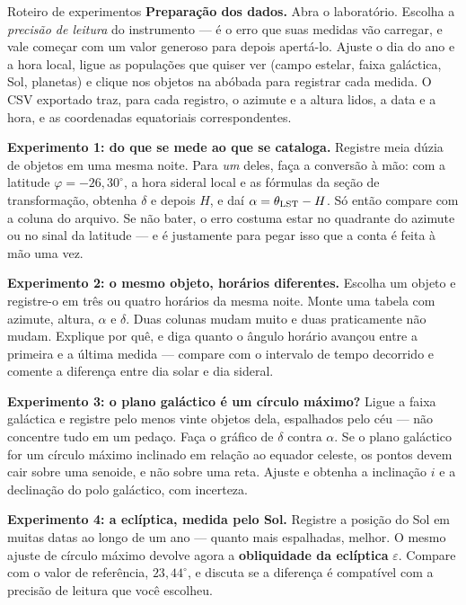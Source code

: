 \documentclass[11pt,a4paper]{article}
\begin{document}
\begin{lessonblock}[borderline west={2pt}{0pt}{astroGold}]{Roteiro de experimentos}
\textbf{Preparação dos dados.} Abra o laboratório. Escolha a \textit{precisão de leitura} do instrumento --- é
o erro que suas medidas vão carregar, e vale começar com um valor generoso para depois apertá-lo. Ajuste o dia
do ano e a hora local, ligue as populações que quiser ver (campo estelar, faixa galáctica, Sol, planetas) e
clique nos objetos na abóbada para registrar cada medida. O CSV exportado traz, para cada registro, o azimute
e a altura lidos, a data e a hora, e as coordenadas equatoriais correspondentes.

\textbf{Experimento 1: do que se mede ao que se cataloga.}
Registre meia dúzia de objetos em uma mesma noite. Para \emph{um} deles, faça a conversão à mão: com a latitude
$\varphi=-26{,}30^\circ$, a hora sideral local e as fórmulas da seção de transformação, obtenha $\delta$ e depois
$H$, e daí $\alpha=\theta_{\rm LST}-H$. Só então compare com a coluna do arquivo. Se não bater, o erro costuma
estar no quadrante do azimute ou no sinal da latitude --- e é justamente para pegar isso que a conta é feita à
mão uma vez.

\textbf{Experimento 2: o mesmo objeto, horários diferentes.}
Escolha um objeto e registre-o em três ou quatro horários da mesma noite. Monte uma tabela com azimute, altura,
$\alpha$ e $\delta$. Duas colunas mudam muito e duas praticamente não mudam. Explique por quê, e diga quanto o
ângulo horário avançou entre a primeira e a última medida --- compare com o intervalo de tempo decorrido e
comente a diferença entre dia solar e dia sideral.

\textbf{Experimento 3: o plano galáctico é um círculo máximo?}
Ligue a faixa galáctica e registre pelo menos vinte objetos dela, espalhados pelo céu --- não concentre tudo em
um pedaço. Faça o gráfico de $\delta$ contra $\alpha$. Se o plano galáctico for um círculo máximo inclinado em
relação ao equador celeste, os pontos devem cair sobre uma senoide, e não sobre uma reta. Ajuste e obtenha a
inclinação $i$ e a declinação do polo galáctico, com incerteza.

\textbf{Experimento 4: a eclíptica, medida pelo Sol.}
Registre a posição do Sol em muitas datas ao longo de um ano --- quanto mais espalhadas, melhor. O mesmo ajuste
de círculo máximo devolve agora a \textbf{obliquidade da eclíptica} $\varepsilon$. Compare com o valor de
referência, $23{,}44^\circ$, e discuta se a diferença é compatível com a precisão de leitura que você escolheu.


\end{lessonblock}
\end{document}
